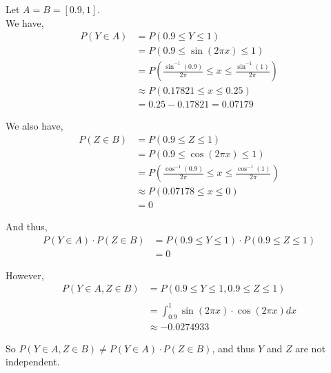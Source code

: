\documentclass[12pt]{article}
\begin{document}
\begin{enumerate}[(\Alph*)]
Let $A = B = [0.9, 1]$.\\

We have,
\begin{align*}
P(Y \in A) &= P(0.9 \leq Y \leq 1)\\
&= P(0.9 \leq \sin(2\pi x) \leq 1)\\
&= P\left(\frac{\sin^{-1}(0.9)}{2\pi} \leq x \leq \frac{\sin^{-1}(1)}{2\pi}\right)\\
&\approx P(0.17821 \leq x \leq 0.25)\\
&= 0.25 - 0.17821 = 0.07179
\end{align*}

We also have,
\begin{align*}
P(Z \in B) &= P(0.9 \leq Z \leq 1)\\
&= P(0.9 \leq \cos(2\pi x) \leq 1)\\
&= P\left(\frac{\cos^{-1}(0.9)}{2\pi} \leq x \leq \frac{\cos^{-1}(1)}{2\pi}\right)\\
&\approx P(0.07178 \leq x \leq 0)\\
&= 0
\end{align*}

And thus,
\begin{align*}
P(Y \in A) \cdot P(Z \in B) &= P(0.9 \leq Y \leq 1) \cdot P(0.9 \leq Z \leq 1)\\
&= 0
\end{align*}

However,
\begin{align*}
P(Y \in A, Z \in B) &= P(0.9 \leq Y \leq 1, 0.9 \leq Z \leq 1)\\\\
&= \int_{0.9}^1 \sin(2\pi x) \cdot \cos(2\pi x) dx\\
&\approx -0.0274933
\end{align*}

So $P(Y \in A, Z \in B) \neq P(Y \in A) \cdot P(Z \in B)$, and thus $Y$ and $Z$ are not independent.

\end{enumerate}
\end{document}
